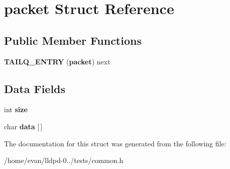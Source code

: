 \section{packet \-Struct \-Reference}
\label{structpacket}
\subsection*{\-Public \-Member \-Functions}
\begin{DoxyCompactItemize}
\item 
{\bfseries \-T\-A\-I\-L\-Q\-\_\-\-E\-N\-T\-R\-Y} ({\bf packet}) next\label{structpacket_aee9ee7ce9a1721b04ebaa45f814a85de}

\end{DoxyCompactItemize}
\subsection*{\-Data \-Fields}
\begin{DoxyCompactItemize}
\item 
int {\bfseries size}\label{structpacket_a439227feff9d7f55384e8780cfc2eb82}

\item 
char {\bfseries data} [$\,$]\label{structpacket_a923b2158227405b9f7a6eceb6c7104c8}

\end{DoxyCompactItemize}


\-The documentation for this struct was generated from the following file\-:\begin{DoxyCompactItemize}
\item 
/home/evan/lldpd-\/0../tests/common.\-h\end{DoxyCompactItemize}
